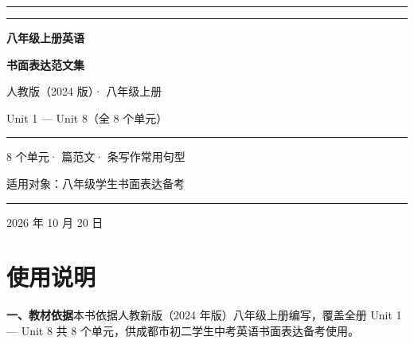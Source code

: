 \documentclass[UTF8,a4paper,11pt,oneside]{ctexbook}
\begin{document}
\linespread{1.32}\selectfont

\begin{titlepage}
  \thispagestyle{empty}
  \centering
  \vspace*{1.4cm}
  {\color{mainblue}\rule{\linewidth}{1.8pt}}\par
  \vspace{0.55cm}
  {\color{rulelight}\rule{\linewidth}{0.6pt}}\par
  \vspace{1.5cm}
  {\sffamily\bfseries\fontsize{36pt}{46pt}\selectfont\color{mainblue} 八年级上册英语\par}
  \vspace{0.35cm}
  {\sffamily\bfseries\fontsize{36pt}{46pt}\selectfont\color{mainblue} 书面表达范文集\par}
  \vspace{1.3cm}
  {\sffamily\fontsize{15pt}{21pt}\selectfont\color{accent} 人教版（2024 版）· 八年级上册\par}
  \vspace{0.3cm}
  {\sffamily\Large\color{mainblue} Unit 1 — Unit 8（全 8 个单元）\par}
  \vspace{1.0cm}
  {\color{accent}\rule{0.62\linewidth}{0.8pt}}\par
  \vspace{0.9cm}
  {\sffamily\large\color{textgray} 8 个单元\quad· 篇范文\quad· 条写作常用句型\par}
  \vfill
  {\large\sffamily 适用对象：八年级学生\quad 书面表达备考\par}
  \vspace{0.9cm}
  {\color{rulelight}\rule{0.62\linewidth}{0.6pt}}\par
  \vspace{0.5cm}
  {\sffamily\normalsize\color{textgray} 2026 年 10 月 20 日\par}
  \vspace*{0.6cm}
\end{titlepage}

\frontmatter
\pagestyle{plain}

\chapter*{使用说明}
{}

\noindent\textbf{一、教材依据}\quad 本书依据人教新版（2024 年版）八年级上册编写，覆盖全册
Unit 1 — Unit 8 共 8 个单元，供成都市初二学生中考英语书面表达备考使用。
\end{document}

